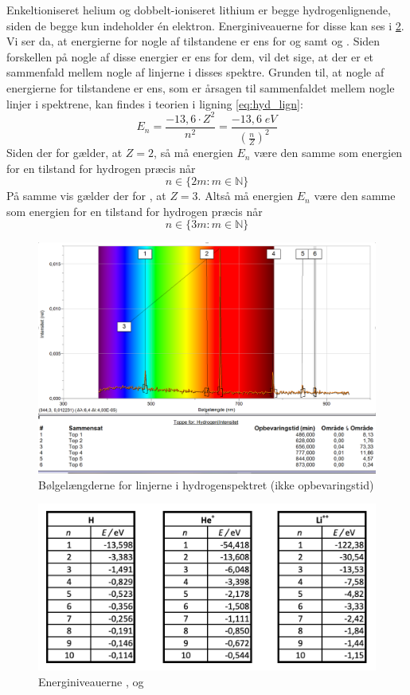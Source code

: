 \documentclass[11pt]{article}
\theoremstyle{definition}
\begin{document}
Enkeltioniseret helium og dobbelt-ioniseret lithium er begge hydrogenlignende, siden de begge kun indeholder én elektron.
Energiniveauerne for disse kan ses i \cref{fig:energiniveau}.
Vi ser da, at energierne for nogle af tilstandene er ens for  og  samt  og .
Siden forskellen på nogle af disse energier er ens for dem, vil det sige, at der er et sammenfald mellem nogle af linjerne i disses spektre.
Grunden til, at nogle af energierne for tilstandene er ens, som er årsagen til sammenfaldet mellem nogle linjer i spektrene, kan findes i teorien i ligning \ref{eq:hyd_lign}:
\[
E_n=\frac{-13,6\cdot Z^2}{n^2}=\frac{-13,6 \;\unit{eV} }{\left(\frac{n}{Z}\right)^2}
\] 
Siden der for  gælder, at $Z=2$, så må energien $E_n$ være den samme som energien for en tilstand for hydrogen præcis når 
\[
n \in \{2m:m  \in \mathbb{N}\}
\] 
På samme vis gælder der for , at $Z=3$. Altså må energien $E_n$ være den samme som energien for en tilstand for hydrogen præcis når 
\[
n \in \{3m:m \in \mathbb{N} \}
\] 
\begin{figure}[H]
\begin{center}
  \includegraphics[width=\textwidth]{top.png}
\end{center}
  \caption{Bølgelængderne for linjerne i hydrogenspektret (ikke opbevaringstid)}
\label{fig:top}
\end{figure}
\begin{figure}[H]
\begin{center}
  \includegraphics[width=\textwidth]{energiniveau.png}
\end{center}
\caption{Energiniveauerne ,  og }
\label{fig:energiniveau}
\end{figure}
\end{document}
